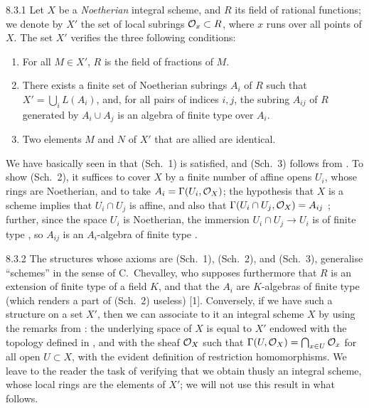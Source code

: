 \documentclass[../main.tex]{subfiles}
\begin{document}
\begin{env}{8.3.1}
    Let $X$ be a \emph{Noetherian} integral scheme, and $R$ its field of rational functions; we denote by $X'$ the set of local subrings $\mathcal{O}_x\subset R$, where $x$ runs over all points of $X$.
    The set $X'$ verifies the three following conditions:
    \begin{enumerate}
        \item[(Sch. 1)] For all $M\in X'$, $R$ is the field of fractions of $M$.
        \item[(Sch. 2)] There exists a finite set of Noetherian subrings $A_i$ of $R$ such that $X'=\bigcup_i L(A_i)$, and, for all pairs of indices $i,j$, the subring $A_{ij}$ of $R$ generated by $A_i\cup A_j$ is an algebra of finite type over $A_i$.
        \item[(Sch. 3)] Two elements $M$ and $N$ of $X'$ that are allied are identical.
    \end{enumerate}
\end{env}

We have basically seen in  that (Sch.~1) is satisfied, and (Sch.~3) follows from .
To show (Sch.~2), it suffices to cover $X$ by a finite number of affine opens $U_i$, whose rings are Noetherian, and to take $A_i=\Gamma(U_i,\mathcal{O}_X)$; the hypothesis that $X$ is a scheme implies that $U_i\cap U_j$ is affine, and also that $\Gamma(U_i\cap U_j,\mathcal{O}_X)=A_{ij}$ ; further, since the space $U_i$ is Noetherian, the immersion $U_i\cap U_j\to U_i$ is of finite type , so $A_{ij}$ is an $A_i$-algebra of finite type .

\begin{env}{8.3.2}
    The structures whose axioms are (Sch.~1), (Sch.~2), and (Sch.~3), generalise ``schemes'' in the sense of C.~Chevalley, who supposes furthermore that $R$ is an extension of finite type of a field $K$, and that the $A_i$ are $K$-algebras of finite type (which renders a part of (Sch.~2) useless) [1].
    Conversely, if we have such a structure on a set $X'$, then we can associate to it an integral scheme $X$ by using the remarks from : the underlying space of $X$ is equal to $X'$ endowed with the topology defined in , and with the sheaf $\mathcal{O}_X$ such that $\Gamma(U,\mathcal{O}_X)=\bigcap_{x\in U}\mathcal{O}_x$ for all open $U\subset X$, with the evident definition of restriction homomorphisms.
    We leave to the reader the task of verifying that we obtain thusly an integral scheme, whose local rings are the elements of $X'$; we will not use this result in what follows.
\end{env}
\end{document}
